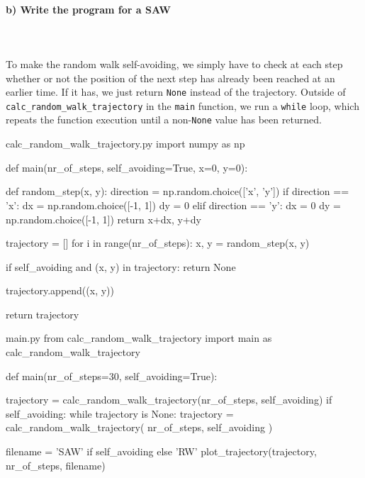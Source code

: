 \paragraph{b) Write the program for a SAW} \ \\
\\
    To make the random walk self-avoiding, we simply have to check 
    at each step whether or not the position of the next step has 
    already been reached at an earlier time. If it has, we just return 
    \lstinline{None} instead of the trajectory. Outside of
    \lstinline{calc_random_walk_trajectory} in the 
    \lstinline{main} function, we run a 
    \lstinline{while} loop, which repeats the function execution until a 
    non-\lstinline{None} value has been returned.
    \begin{code}{calc\_random\_walk\_trajectory.py}
        import numpy as np
        
        
        def main(nr_of_steps, self_avoiding=True, x=0, y=0):
        
            def random_step(x, y):
                direction = np.random.choice(['x', 'y'])
                if direction == 'x':
                    dx = np.random.choice([-1, 1])
                    dy = 0
                elif direction == 'y':
                    dx = 0
                    dy = np.random.choice([-1, 1])
                return x+dx, y+dy

            trajectory = []
            for i in range(nr_of_steps):
                x, y = random_step(x, y)
        
                if self_avoiding and (x, y) in trajectory:
                    return None
        
                trajectory.append((x, y))
        
            return trajectory\end{code}

    \begin{code}{main.py}
        from calc_random_walk_trajectory import main as calc_random_walk_trajectory
        
        
        def main(nr_of_steps=30, self_avoiding=True):
        
            trajectory = calc_random_walk_trajectory(nr_of_steps, self_avoiding)
            if self_avoiding:
                while trajectory is None:
                    trajectory = calc_random_walk_trajectory(
                        nr_of_steps, self_avoiding
                    )
        
            filename = 'SAW' if self_avoiding else 'RW'
            plot_trajectory(trajectory, nr_of_steps, filename)\end{code}


